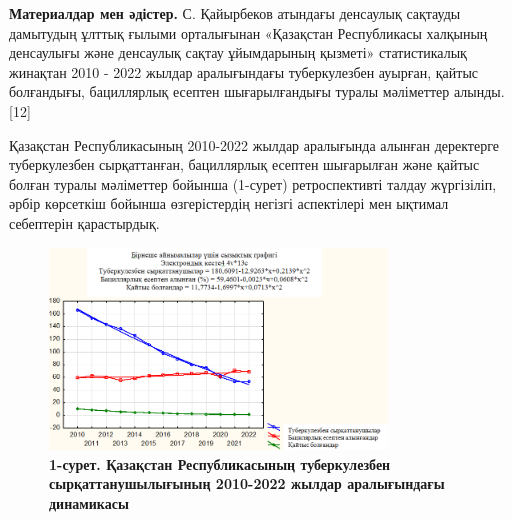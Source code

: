 \begin{multicols}{2}
{\bfseries Материалдар мен әдістер.} С. Қайырбеков атындағы денсаулық
сақтауды дамытудың ұлттық ғылыми орталығынан «Қазақстан Республикасы
халқының денсаулығы және денсаулық сақтау ұйымдарының қызметі»
статистикалық жинақтан 2010 - 2022 жылдар аралығындағы туберкулезбен
ауырған, қайтыс болғандығы, бациллярлық есептен шығарылғандығы туралы
мәліметтер алынды. {[}12{]}

Қазақстан Республикасының 2010-2022 жылдар аралығында алынған деректерге
туберкулезбен сырқаттанған, бациллярлық есептен шығарылған және қайтыс
болған туралы мәліметтер бойынша (1-сурет) ретроспективті талдау
жүргізіліп, әрбір көрсеткіш бойынша өзгерістердің негізгі аспектілері
мен ықтимал себептерін қарастырдық.

\end{multicols}

\begin{figure}[H]
	\centering
	\includegraphics[width=0.8\textwidth]{assets/168}
	\caption*{\bfseries 1-сурет. Қазақстан Республикасының туберкулезбен
  сырқаттанушылығының 2010-2022 жылдар аралығындағы динамикасы}
\end{figure}


